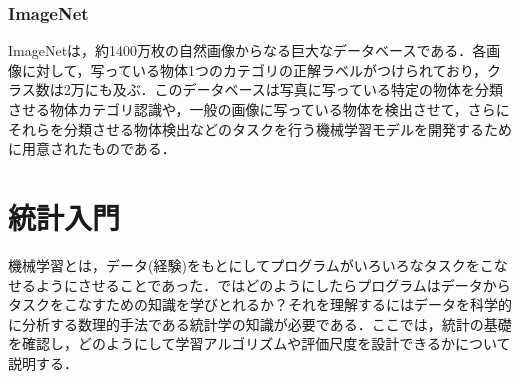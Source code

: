 \documentclass[a4paper,11pt]{jsreport}
\begin{document}
\subsubsection{ImageNet}
ImageNetは，約1400万枚の自然画像からなる巨大なデータベースである．各画像に対して，写っている物体1つのカテゴリの正解ラベルがつけられており，クラス数は2万にも及ぶ．このデータベースは写真に写っている特定の物体を分類させる物体カテゴリ認識や，一般の画像に写っている物体を検出させて，さらにそれらを分類させる物体検出などのタスクを行う機械学習モデルを開発するために用意されたものである．

\section{統計入門}
機械学習とは，データ(経験)をもとにしてプログラムがいろいろなタスクをこなせるようにさせることであった．ではどのようにしたらプログラムはデータからタスクをこなすための知識を学びとれるか？それを理解するにはデータを科学的に分析する数理的手法である統計学の知識が必要である．ここでは，統計の基礎を確認し，どのようにして学習アルゴリズムや評価尺度を設計できるかについて説明する．
\end{document}
